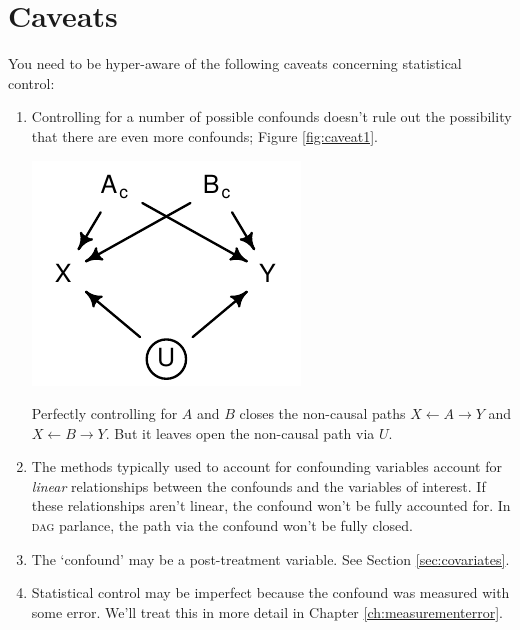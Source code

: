 \documentclass[a4paper]{tufte-book}\usepackage[]{graphicx}\usepackage[]{xcolor}
\begin{document}
\clearpage

\section{Caveats}
You need to be hyper-aware of the following caveats
concerning statistical control:

\begin{enumerate}
  \item Controlling for a number of possible confounds doesn't rule
  out the possibility that there are even more confounds; Figure \ref{fig:caveat1}.

  \begin{marginfigure}
    \centering
    \includegraphics{figure/caveat1}
    \caption{Perfectly controlling for $A$ and $B$ closes the non-causal paths $X \leftarrow A \rightarrow Y$ and $X \leftarrow B \rightarrow Y$. But it leaves open the non-causal path via $U$.}
    \label{fig:caveat1}
  \end{marginfigure}

  \item The methods typically used to account for confounding variables
  account for \emph{linear} relationships between the confounds and the
  variables of interest. If these relationships aren't linear, the
  confound won't be fully accounted for. In \textsc{dag} parlance, the path
  via the confound won't be fully closed.

  \item The `confound' may be a post-treatment variable. See Section
  \vref{sec:covariates}.

  \item Statistical control may be imperfect because the confound was
  measured with some error. We'll treat this in more detail in Chapter
  \ref{ch:measurementerror}.

\end{enumerate}
\end{document}
